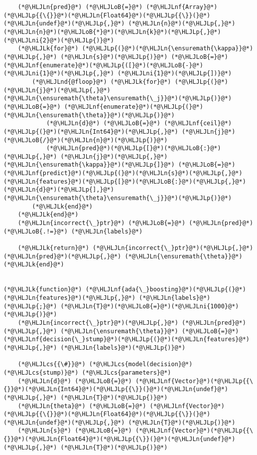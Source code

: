 \documentclass[12pt,a4paper]{article}
\newcommand{\HLJLk}[1]{\textcolor[RGB]{148,91,176}{\textbf{#1}}}
\newcommand{\HLJLn}[1]{#1}
\newcommand{\HLJLnd}[1]{\textcolor[RGB]{214,102,97}{#1}}
\newcommand{\HLJLnf}[1]{\textcolor[RGB]{66,102,213}{#1}}
\newcommand{\HLJLni}[1]{\textcolor[RGB]{59,151,46}{#1}}
\newcommand{\HLJLoB}[1]{\textcolor[RGB]{102,102,102}{\textbf{#1}}}
\newcommand{\HLJLp}[1]{#1}
\newcommand{\HLJLcs}[1]{\textcolor[RGB]{153,153,119}{\textit{#1}}}
\begin{document}
\begin{lstlisting}
    (*@\HLJLn{pred}@*) (*@\HLJLoB{=}@*) (*@\HLJLnf{Array}@*)(*@\HLJLp{{\{}}@*)(*@\HLJLn{Float64}@*)(*@\HLJLp{{\}}(}@*)(*@\HLJLn{undef}@*)(*@\HLJLp{,}@*) (*@\HLJLn{n}@*)(*@\HLJLp{,}@*) (*@\HLJLn{n}@*)(*@\HLJLoB{*}@*)(*@\HLJLn{k}@*)(*@\HLJLp{,}@*) (*@\HLJLni{2}@*)(*@\HLJLp{)}@*)
    (*@\HLJLk{for}@*) (*@\HLJLp{(}@*)(*@\HLJLn{\ensuremath{\kappa}}@*)(*@\HLJLp{,}@*) (*@\HLJLn{s}@*)(*@\HLJLp{)}@*) (*@\HLJLoB{=}@*) (*@\HLJLnf{enumerate}@*)(*@\HLJLp{([}@*)(*@\HLJLoB{-}@*)(*@\HLJLni{1}@*)(*@\HLJLp{,}@*) (*@\HLJLni{1}@*)(*@\HLJLp{])}@*)
        (*@\HLJLnd{@floop}@*) (*@\HLJLk{for}@*) (*@\HLJLp{(}@*)(*@\HLJLn{j}@*)(*@\HLJLp{,}@*) (*@\HLJLn{\ensuremath{\theta}\ensuremath{\_j}}@*)(*@\HLJLp{)}@*) (*@\HLJLoB{=}@*) (*@\HLJLnf{enumerate}@*)(*@\HLJLp{(}@*)(*@\HLJLn{\ensuremath{\theta}}@*)(*@\HLJLp{)}@*)
            (*@\HLJLn{d}@*) (*@\HLJLoB{=}@*) (*@\HLJLnf{ceil}@*)(*@\HLJLp{(}@*)(*@\HLJLn{Int64}@*)(*@\HLJLp{,}@*) (*@\HLJLn{j}@*)(*@\HLJLoB{/}@*)(*@\HLJLn{n}@*)(*@\HLJLp{)}@*)
            (*@\HLJLn{pred}@*)(*@\HLJLp{[}@*)(*@\HLJLoB{:}@*)(*@\HLJLp{,}@*) (*@\HLJLn{j}@*)(*@\HLJLp{,}@*) (*@\HLJLn{\ensuremath{\kappa}}@*)(*@\HLJLp{]}@*) (*@\HLJLoB{=}@*) (*@\HLJLnf{predict}@*)(*@\HLJLp{(}@*)(*@\HLJLn{s}@*)(*@\HLJLp{,}@*) (*@\HLJLn{features}@*)(*@\HLJLp{[}@*)(*@\HLJLoB{:}@*)(*@\HLJLp{,}@*) (*@\HLJLn{d}@*)(*@\HLJLp{],}@*) (*@\HLJLn{\ensuremath{\theta}\ensuremath{\_j}}@*)(*@\HLJLp{)}@*)
        (*@\HLJLk{end}@*) 
    (*@\HLJLk{end}@*)
    (*@\HLJLn{incorrect{\_}ptr}@*) (*@\HLJLoB{=}@*) (*@\HLJLn{pred}@*) (*@\HLJLoB{.!=}@*) (*@\HLJLn{labels}@*)

    (*@\HLJLk{return}@*) (*@\HLJLn{incorrect{\_}ptr}@*)(*@\HLJLp{,}@*) (*@\HLJLn{pred}@*)(*@\HLJLp{,}@*) (*@\HLJLn{\ensuremath{\theta}}@*)
(*@\HLJLk{end}@*)


(*@\HLJLk{function}@*) (*@\HLJLnf{ada{\_}boosting}@*)(*@\HLJLp{(}@*)(*@\HLJLn{features}@*)(*@\HLJLp{,}@*) (*@\HLJLn{labels}@*)(*@\HLJLp{;}@*) (*@\HLJLn{T}@*)(*@\HLJLoB{=}@*)(*@\HLJLni{1000}@*)(*@\HLJLp{)}@*)
    (*@\HLJLn{incorrect{\_}ptr}@*)(*@\HLJLp{,}@*) (*@\HLJLn{pred}@*)(*@\HLJLp{,}@*) (*@\HLJLn{\ensuremath{\theta}}@*) (*@\HLJLoB{=}@*) (*@\HLJLnf{decision{\_}stump}@*)(*@\HLJLp{(}@*)(*@\HLJLn{features}@*)(*@\HLJLp{,}@*) (*@\HLJLn{labels}@*)(*@\HLJLp{)}@*)
    
    (*@\HLJLcs{{\#}}@*) (*@\HLJLcs{model(decision}@*) (*@\HLJLcs{stump)}@*) (*@\HLJLcs{parameters}@*)
    (*@\HLJLn{d}@*) (*@\HLJLoB{=}@*) (*@\HLJLnf{Vector}@*)(*@\HLJLp{{\{}}@*)(*@\HLJLn{Int64}@*)(*@\HLJLp{{\}}(}@*)(*@\HLJLn{undef}@*)(*@\HLJLp{,}@*) (*@\HLJLn{T}@*)(*@\HLJLp{)}@*)
    (*@\HLJLn{theta}@*) (*@\HLJLoB{=}@*) (*@\HLJLnf{Vector}@*)(*@\HLJLp{{\{}}@*)(*@\HLJLn{Float64}@*)(*@\HLJLp{{\}}(}@*)(*@\HLJLn{undef}@*)(*@\HLJLp{,}@*) (*@\HLJLn{T}@*)(*@\HLJLp{)}@*)
    (*@\HLJLn{s}@*) (*@\HLJLoB{=}@*) (*@\HLJLnf{Vector}@*)(*@\HLJLp{{\{}}@*)(*@\HLJLn{Float64}@*)(*@\HLJLp{{\}}(}@*)(*@\HLJLn{undef}@*)(*@\HLJLp{,}@*) (*@\HLJLn{T}@*)(*@\HLJLp{)}@*)


\end{lstlisting}
\end{document}
